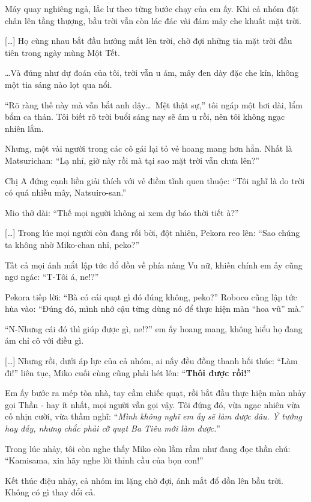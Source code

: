 \documentclass[../main.tex]{subfiles}
\begin{document}
Máy quay nghiêng ngả, lắc lư theo từng bước chạy của em ấy. Khi cả nhóm đặt chân lên tầng thượng, bầu trời vẫn còn lác đác vài đám mây che khuất mặt trời.

\il

[\dots] Họ cùng nhau bắt đầu hướng mắt lên trời, chờ đợi những tia mặt trời đầu tiên trong ngày mùng Một Tết.

\dots Và đúng như dự đoán của tôi, trời vẫn u ám, mây đen dày đặc che kín, không một tia sáng nào lọt qua nổi.

``Rõ ràng thế này mà vẫn bắt anh dậy\dots\ Mệt thật sự,'' tôi ngáp một hơi dài, lẩm bẩm ca thán. Tôi biết rõ trời buổi sáng nay sẽ âm u rồi, nên tôi không ngạc nhiên lắm.

Nhưng, một vài người trong các cô gái lại tỏ vẻ hoang mang hơn hẳn. Nhất là Matsurichan: ``Lạ nhỉ, giờ này rồi mà tại sao mặt trời vẫn chưa lên?''

Chị A đứng cạnh liền giải thích với vẻ điềm tĩnh quen thuộc: ``Tôi nghĩ là do trời có quá nhiều mây, Natsuiro-san.''

Mio thở dài: ``Thế mọi người không ai xem dự báo thời tiết à?''

[\dots] Trong lúc mọi người còn đang rối bời, đột nhiên, Pekora reo lên: ``Sao chúng ta không nhờ Miko-chan nhỉ, peko?''

Tất cả mọi ánh mắt lập tức đổ dồn về phía nàng Vu nữ, khiến chính em ấy cũng ngơ ngác: ``T-Tôi á, ne!?''

Pekora tiếp lời: ``Bà có cái quạt gì đó đúng không, peko?'' Roboco cũng lập tức hùa vào: ``Đúng đó, mình nhớ cậu từng dùng nó để thực hiện màn ``hoa vũ'' mà.''

``N-Nhưng cái đó thì giúp được gì, ne!?'' em ấy hoang mang, không hiểu họ đang ám chỉ cô với điều gì.

    [\dots] Nhưng rồi, dưới áp lực của cả nhóm, ai nấy đều đồng thanh hối thúc: ``Làm đi!'' liên tục, Miko cuối cùng cũng phải hét lên: ``\textbf{Thôi được rồi!}''

Em ấy bước ra mép tòa nhà, tay cầm chiếc quạt, rồi bắt đầu thực hiện màn nhảy gọi Thần - hay ít nhất, mọi người vẫn gọi vậy. Tôi đứng đó, vừa ngạc nhiên vừa cố nhịn cười, vừa thầm nghĩ: ``\textit{Mình không nghĩ em ấy sẽ làm được đâu. Ý tưởng hay đấy, nhưng chắc phải cỡ quạt Ba Tiêu mới làm được.}''

Trong lúc nhảy, tôi còn nghe thấy Miko còn lầm rầm như đang đọc thần chú: ``Kamisama, xin hãy nghe lời thỉnh cầu của bọn con!''

Kết thúc điệu nhảy, cả nhóm im lặng chờ đợi, ánh mắt đổ dồn lên bầu trời. Không có gì thay đổi cả.
\end{document}
